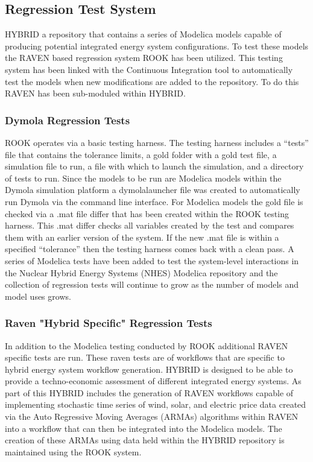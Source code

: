 \subsection{Regression Test System}
HYBRID a repository that contains a series of Modelica models capable of producing potential integrated energy system configurations. To test these models the RAVEN based regression system ROOK has been utilized. This testing system has been linked with the Continuous Integration tool to automatically test the models when new modifications are added to the repository. To do this RAVEN has been sub-moduled within HYBRID. 

\subsubsection{Dymola Regression Tests}
ROOK operates via a basic testing harness. The testing harness includes a “tests” file that contains the tolerance limits, a gold folder with a gold test file, a simulation file to run, a file with which to launch the simulation, and a directory of tests to run. Since the models to be run are Modelica models within the Dymola simulation platform a dymola\textunderscore launcher file was created to automatically run Dymola via the command line interface. For Modelica models the gold file is checked via a .mat file differ that has been created within the ROOK testing harness. This .mat differ checks all variables created by the test and compares them with an earlier version of the system. If the new .mat file is within a specified “tolerance” then the testing harness comes back with a clean pass.  A series of Modelica tests have been added to test the system-level interactions in the Nuclear Hybrid Energy Systems (NHES) Modelica repository and the collection of regression tests will continue to grow as the number of models and model uses grows.

\subsubsection{Raven "Hybrid Specific" Regression Tests}
In addition to the Modelica testing conducted by ROOK additional RAVEN specific tests are run. These raven tests are of workflows that are specific to hybrid energy system workflow generation. HYBRID is designed to be able to provide a techno-economic assessment of different integrated energy systems. As part of this HYBRID includes the generation of RAVEN workflows capable of implementing stochastic time series of wind, solar, and electric price data created via the Auto Regressive Moving Averages (ARMAs) algorithms within RAVEN into a workflow that can then be integrated into the Modelica models. The creation of these ARMAs using data held within the HYBRID repository is maintained using the ROOK system. 


